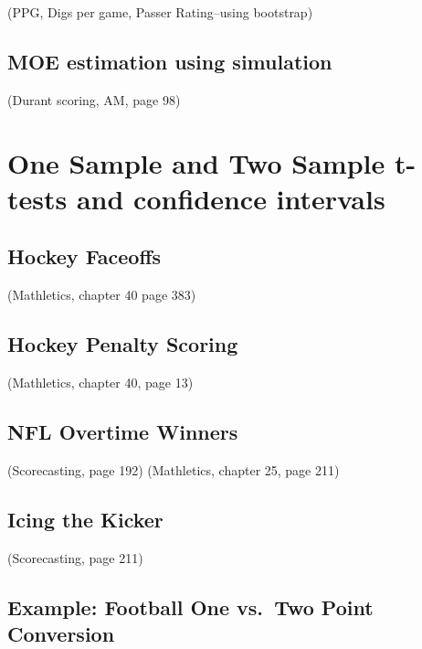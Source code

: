 \documentclass[
  11pt,
]{book}
\theoremstyle{definition}
\theoremstyle{definition}
\theoremstyle{definition}
\theoremstyle{definition}
\theoremstyle{remark}
\begin{document}
(PPG, Digs per game, Passer Rating--using bootstrap)

\hypertarget{moe-estimation-using-simulation}{%
\subsection{MOE estimation using simulation}\label{moe-estimation-using-simulation}}

(Durant scoring, AM, page 98)

\hypertarget{one-sample-and-two-sample-t-tests-and-confidence-intervals}{%
\section{One Sample and Two Sample t-tests and confidence intervals}\label{one-sample-and-two-sample-t-tests-and-confidence-intervals}}

\hypertarget{hockey-faceoffs}{%
\subsection{Hockey Faceoffs}\label{hockey-faceoffs}}

(Mathletics, chapter 40 page 383)

\hypertarget{hockey-penalty-scoring}{%
\subsection{Hockey Penalty Scoring}\label{hockey-penalty-scoring}}

(Mathletics, chapter 40, page 13)

\hypertarget{nfl-overtime-winners}{%
\subsection{NFL Overtime Winners}\label{nfl-overtime-winners}}

(Scorecasting, page 192)
(Mathletics, chapter 25, page 211)

\hypertarget{icing-the-kicker}{%
\subsection{Icing the Kicker}\label{icing-the-kicker}}

(Scorecasting, page 211)

\hypertarget{example-football-one-vs.-two-point-conversion}{%
\subsection{Example: Football One vs.~Two Point Conversion}\label{example-football-one-vs.-two-point-conversion}}
\end{document}
